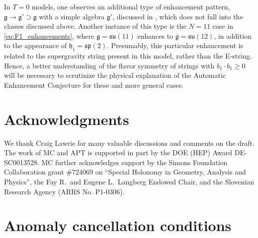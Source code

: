 \documentclass[11pt, a4paper]{article}
\newcommand*{\fkg}{\ensuremath{\mathfrak{g}}}
\newcommand*{\fkh}{\ensuremath{\mathfrak{h}}}
\newcommand*{\fksu}{\ensuremath{\mathfrak{su}}}
\newcommand*{\fksp}{\ensuremath{\mathfrak{sp}}}
\begin{document}
In $T=0$ models, one observes an additional type of enhancement pattern, $\fkg \to \fkg' \supset \fkg$ with a simple algebra $\fkg'$, discussed in \cite{Raghuram:2020vxm}, which does not fall into the classes discussed above.
Another instance of this type is the $N=11$ case in \cref{eq:F1_enhancements}, where $\fkg = \fksu(11)$ enhances to $\overline{\fkg} = \fksu(12)$, in addition to the appearance of $\fkh_1 = \fksp(2)$.
Presumably, this particular enhancement is related to the supergravity string present in this model, rather than the E-string.
Hence, a better understanding of the flavor symmetry of strings with $b_1 \cdot b_1 \ge 0$ will be necessary to scrutinize the physical explanation of the Automatic Enhancement Conjecture for these and more general cases.






\section*{Acknowledgments}

We thank Craig Lawrie for many valuable discussions and comments on the draft.
The work of MC and APT is supported in part by the DOE (HEP) Award DE-SC0013528. 
MC further acknowledges support by the Simons Foundation Collaboration grant \#724069 on ``Special Holonomy in Geometry, Analysis and Physics'', the Fay R.~and Eugene L.~Langberg Endowed Chair, and the Slovenian Research Agency (ARRS No. P1-0306).

\appendix

\section{Anomaly cancellation conditions}
\label{app:anomaly_conditions}
\end{document}
